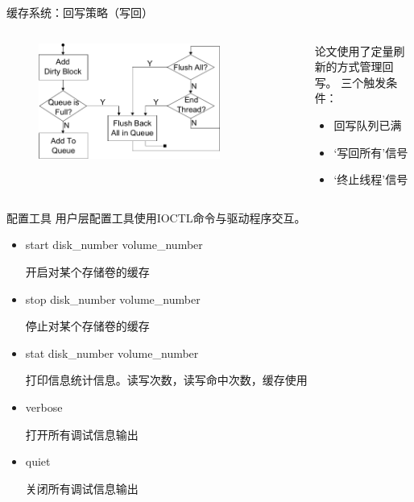\documentclass[compress]{beamer}
\begin{document}
\begin{frame}{缓存系统：回写策略（写回）}
    \begin{columns}
    \begin{column}{0.5\textwidth}
        \begin{figure}
        \includegraphics[width=0.8\textwidth]{../graph/write-back-thread}
        \end{figure}
    \end{column}
    \begin{column}{0.5\textwidth}
        论文使用了定量刷新的方式管理回写。
        三个触发条件：
        \begin{itemize}
        \item 回写队列已满
        \item ‘写回所有’信号
        \item ‘终止线程’信号
        \end{itemize}
    \end{column}
    \end{columns}
\end{frame}

\begin{frame}{配置工具}
用户层配置工具使用IOCTL命令与驱动程序交互。
\begin{itemize}

\item start   disk\_number   volume\_number

开启对某个存储卷的缓存

\item stop   disk\_number   volume\_number

停止对某个存储卷的缓存

\item stat   disk\_number   volume\_number

打印信息统计信息。读写次数，读写命中次数，缓存使用

\item verbose

打开所有调试信息输出

\item quiet

关闭所有调试信息输出

\end{itemize}
\end{frame}
\end{document}
